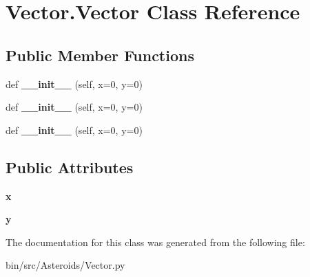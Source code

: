 \hypertarget{classVector_1_1Vector}{}\section{Vector.\+Vector Class Reference}
\label{classVector_1_1Vector}
\subsection*{Public Member Functions}
\begin{DoxyCompactItemize}
\item 
def {\bfseries \+\_\+\+\_\+init\+\_\+\+\_\+} (self, x=0, y=0)\hypertarget{classVector_1_1Vector_a53f3e407d6040c60bbb2faa503243218}{}\label{classVector_1_1Vector_a53f3e407d6040c60bbb2faa503243218}

\item 
def {\bfseries \+\_\+\+\_\+init\+\_\+\+\_\+} (self, x=0, y=0)\hypertarget{classVector_1_1Vector_a53f3e407d6040c60bbb2faa503243218}{}\label{classVector_1_1Vector_a53f3e407d6040c60bbb2faa503243218}

\item 
def {\bfseries \+\_\+\+\_\+init\+\_\+\+\_\+} (self, x=0, y=0)\hypertarget{classVector_1_1Vector_a53f3e407d6040c60bbb2faa503243218}{}\label{classVector_1_1Vector_a53f3e407d6040c60bbb2faa503243218}

\end{DoxyCompactItemize}
\subsection*{Public Attributes}
\begin{DoxyCompactItemize}
\item 
{\bfseries x}\hypertarget{classVector_1_1Vector_a7f3c3f2b1e0b9e3b97a4f9991a76e0b2}{}\label{classVector_1_1Vector_a7f3c3f2b1e0b9e3b97a4f9991a76e0b2}

\item 
{\bfseries y}\hypertarget{classVector_1_1Vector_a61e9316c753c3d76705841e0d009e4b6}{}\label{classVector_1_1Vector_a61e9316c753c3d76705841e0d009e4b6}

\end{DoxyCompactItemize}


The documentation for this class was generated from the following file\+:\begin{DoxyCompactItemize}
\item 
bin/src/\+Asteroids/Vector.\+py\end{DoxyCompactItemize}
